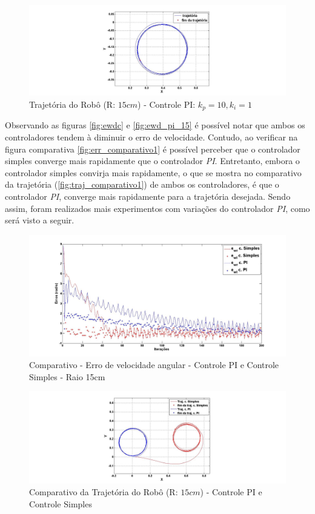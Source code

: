 \begin{figure}[!htb]
	\centering
	\includegraphics[width=1.0\textwidth]{./04-figuras/trajetoria_b1_15_pi}
	\caption{Trajetória do Robô (R: $15cm$) - Controle PI: $k_{p}=10,k_{i}=1$}
	\label{fig:traj_pi_15}
\end{figure}

Observando as figuras \ref{fig:ewdc} e \ref{fig:ewd_pi_15} é possível notar que ambos os controladores tendem à diminuir o erro de velocidade. Contudo, ao verificar na figura comparativa \autoref{fig:err_comparativo1} é possível perceber que o controlador simples converge mais rapidamente que o controlador \emph{PI}. Entretanto, embora  o controlador simples convirja mais rapidamente, o que se mostra no comparativo da trajetória (\autoref{fig:traj_comparativo1}) de ambos os controladores, é que o controlador \emph{PI}, converge mais rapidamente para a trajetória desejada. Sendo assim, foram realizados mais experimentos com variações do controlador \emph{PI}, como será visto a seguir. 

\begin{figure}[!htb]
	\centering
	\includegraphics[width=1.0\textwidth]{./04-figuras/ew_comparativo1}
	\caption{Comparativo - Erro de velocidade angular - Controle PI e Controle Simples - Raio 15cm}
	\label{fig:err_comparativo1}
\end{figure}

\begin{figure}[!htb]
	\centering
	\includegraphics[width=1.0\textwidth]{./04-figuras/traj_comparativo1}
	\caption{Comparativo da Trajetória do Robô (R: $15cm$) - Controle PI e Controle Simples}
	\label{fig:traj_comparativo1}
\end{figure}

